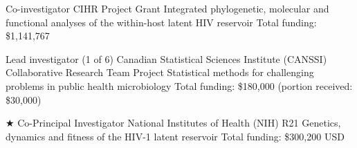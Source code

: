 {Co-investigator}
{CIHR Project Grant}  %
{Integrated phylogenetic, molecular and functional analyses of the within-host latent HIV reservoir}
{Total funding: \$1,141,767}
{
}

{Lead investigator (1 of 6)}
{Canadian Statistical Sciences Institute (CANSSI) Collaborative Research Team Project}
{Statistical   methods   for   challenging   problems   in   public   health   microbiology}
{Total funding: \$180,000 (portion received: \$30,000)}
{
}



{$\bigstar$ Co-Principal Investigator}
{National Institutes of Health (NIH) R21}  %
{Genetics, dynamics and fitness of the HIV-1 latent reservoir}
{Total funding: \$300,200 USD}
{
}


